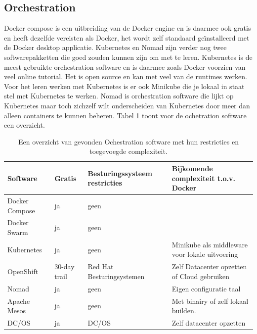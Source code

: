 \subsection{Orchestration}
Docker compose is een uitbreiding van de Docker engine en is daarmee ook gratis en heeft dezelfde vereisten als Docker, het wordt zelf standaard geïnstalleerd met de Docker desktop applicatie. Kubernetes en Nomad zijn verder nog twee softwarepakketten die goed zouden kunnen zijn om met te leren. Kubernetes is de meest gebruikte orchestration software en is daarmee zoals Docker voorzien van veel online tutorial. Het is open source en kan met veel van de runtimes werken. Voor het leren werken met Kubernetes is er ook Minikube die je lokaal in staat stel met Kubernetes te werken. Nomad is orchestration software die lijkt op Kubernetes maar toch zichzelf wilt onderscheiden van Kubernetes door meer dan alleen containers te kunnen beheren. Tabel \ref{tab:Ochestration} toont voor de ochetration software een overzicht.
\begin{center}
    \begin{table}
        \begin{tabular}{ m{3cm} || m{1.5cm} | m{3.3cm} | m{4.5cm} }
            Software & Gratis & Besturingssysteem restricties & Bijkomende complexiteit t.o.v. Docker \\ 
            \hline
            Docker Compose & ja & geen &  \\  
            \hline
            Docker Swarm & ja & geen & \\
            \hline 
            Kubernetes & ja & geen & Minikube als middleware voor lokale uitvoering \\
            \hline
            OpenShift & 30-day trail & Red Hat Besturingsystemen & Zelf Datacenter opzetten of Cloud gebruiken \\
            \hline
            Nomad & ja & geen & Eigen configuratie taal \\
            \hline
            Apache Mesos & ja & geen & Met binairy of zelf lokaal builden.  \\
            \hline 
            DC/OS & ja & DC/OS & Zelf datacenter opzetten \\
        \end{tabular}
        \caption[Overzicht ochestration]{Een overzicht van gevonden Ochestration software met hun restricties en toegevoegde complexiteit.}
        \label{tab:Ochestration}
    \end{table}
\end{center}

